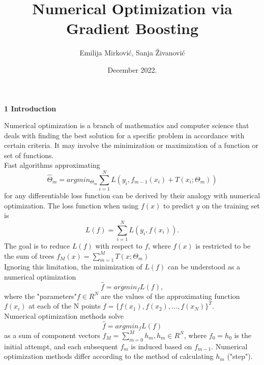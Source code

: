 \documentclass[12pt, letterpaper, twoside]{article}
\title{ %
    Numerical Optimization via Gradient
Boosting
    \\ }
\author{Emilija Mirković, Sanja Živanović}
\date{December 2022.}
\begin{document}
\maketitle
\begin{center}
\textbf{\large{1 Introduction}} 

\end{center}
\hspace*{4ex}Numerical optimization is a branch of mathematics and computer science that deals with finding the best solution for a specific problem in accordance with certain criteria. It may involve the minimization or maximization of a function or set of functions.\\
\hspace*{4ex}Fast algorithms approximating 
\begin{equation*}
\hat{\Theta}_{m}=argmin_{\Theta_{m}}\sum_{i=1}^N L(y_i,f_{m-1}(x_i)+T(x_i;\Theta_m))
\end{equation*}
for any differentiable loss function can be derived by their analogy with numerical optimization. The loss function when using $f(x)$ to predict $y$ on the training set is
\begin{equation*}
L(f)=\sum_{i=1}^N L(y_i,f(x_i)).
\end{equation*}
The goal is to reduce $L(f)$ with respect to $f$, where $f(x)$ is restricted to be the sum of trees $f_M(x)=\sum _{m=1}^M T(x;\Theta_m)$\\
\hspace*{4ex} Ignoring this limitation, the minimization of $L(f)$ can be understood as a numerical optimization
\begin{equation*}
\hat{f}=argmin_f L(f),
\end{equation*}
where the "parameters"\space $f \in R^N$ are the values of the approximating function $f(x_i)$ at each of the N points $f = \{f(x_1), f(x_2),...,f(x_N)\}^T$.\\
\hspace*{4ex} Numerical optimization methods solve
\begin{equation*}
\hat{f}=argmin_f L(f)
\end{equation*}
as a sum of component vectors $f_M=\sum_{m=0}^M h_m, h_m \in R^N$, where $f_0=h_0$ is the initial attempt, and each subsequent $f_m$ is induced based on $f_{m−1}$. Numerical optimization methods differ according to the method of calculating $h_m$ ("step").
\end{document}
